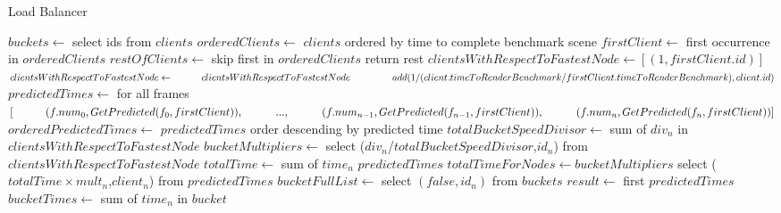 ﻿\documentclass[a4paper]{article}
\begin{document}
    \begin{algorithm}
        \caption{Load Balancer}\label{alg:cap}
        \begin{algorithmic}[1]
            \State $buckets \gets$ select ids from $clients$
            \State $orderedClients \gets$ $clients$ ordered by time to complete benchmark scene
            \State $firstClient \gets$ first occurrence in $orderedClients$
            \State $restOfClients \gets$ skip first in $orderedClients$ return rest
            \State $clientsWithRespectToFastestNode \gets [(1,firstClient.id)]$
                \State $clientsWithRespectToFastestNode \gets \newline \indent \indent clientsWithRespectToFastestNode \newline \indent \indent \indent add (1/(client.timeToRenderBenchmark / firstClient.timeToRenderBenchmark),client.id)$
            \EndFor
            \State $predictedTimes \gets$ \newline \indent for all frames $[ \newline \indent \indent (f.num_0, GetPredicted(f_0,firstClient)), \newline \indent \indent ..., \newline \indent \indent (f.num_{n-1}, GetPredicted(f_{n-1},firstClient)), \newline \indent \indent (f.num_{n}, GetPredicted(f_{n},firstClient))]$
            \State $orderedPredictedTimes \gets$ $predictedTimes$ order descending by predicted time
            \State $totalBucketSpeedDivisor \gets$ sum of $div_n$ in $clientsWithRespectToFastestNode$
            \State $bucketMultipliers \gets$ select ($div_n$/$totalBucketSpeedDivisor$,$id_n$) from $clientsWithRespectToFastestNode$
            \State $totalTime \gets$ sum of $time_n$ $predictedTimes$
            \State $totalTimeForNodes \gets bucketMultipliers$ select ($totalTime \times mult_n$,$client_n$) from $predictedTimes$
            \State $bucketFullList \gets$ select $(false,id_n)$ from $buckets$
                \State $result \gets$ first $predictedTimes$
                    \State $bucketTimes \gets$ sum of $time_n$ in $bucket$

\end{algorithmic}
\end{algorithm}
\end{document}
